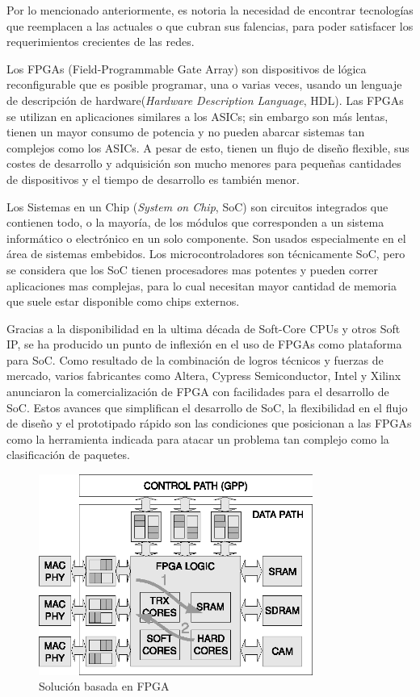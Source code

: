 Por lo mencionado anteriormente, es notoria la necesidad de encontrar tecnologías que reemplacen a las actuales o que cubran sus falencias, para poder satisfacer los requerimientos crecientes de las redes. 

Los FPGAs (Field-Programmable Gate Array) son dispositivos de lógica reconfigurable que es posible programar, una o varias veces, usando un lenguaje de descripción de hardware(\textit{Hardware Description Language}, HDL). Las FPGAs se utilizan en aplicaciones similares a los ASICs; sin embargo son más lentas, tienen un mayor consumo de potencia y no pueden abarcar sistemas tan complejos como los ASICs. A pesar de esto, tienen un flujo de diseño flexible, sus costes de desarrollo y adquisición son mucho menores para pequeñas cantidades de dispositivos y el tiempo de desarrollo es también menor.



Los Sistemas en un Chip (\textit{System on Chip}, SoC) son circuitos integrados que contienen todo, o la mayoría, de los módulos que corresponden a un sistema informático o electrónico en un solo componente. Son usados especialmente en el área de sistemas embebidos. Los microcontroladores son técnicamente SoC, pero se considera que los SoC tienen procesadores mas potentes y pueden correr aplicaciones mas complejas, para lo cual necesitan mayor cantidad de memoria que suele estar disponible como chips externos. 

Gracias a la disponibilidad en la ultima década de Soft-Core CPUs y otros Soft IP, se ha producido un punto de inflexión en el uso de FPGAs como plataforma para SoC. Como resultado de la combinación de logros técnicos y fuerzas de mercado, varios fabricantes como Altera, Cypress Semiconductor, Intel y Xilinx anunciaron la comercialización de FPGA con facilidades para el desarrollo de SoC.
Estos avances que simplifican el desarrollo de SoC, la flexibilidad en el flujo de diseño y el prototipado rápido son las condiciones que posicionan a las FPGAs como la herramienta indicada para atacar un problema tan complejo como la clasificación de paquetes. 

 \begin{figure}[h]
  \centering
	 \includegraphics[width=0.8\textwidth]{1-introduccion/graf/FPGA_based.eps}
  \caption{Solución basada en FPGA}
  \label{fig:diseno}
\end{figure}

